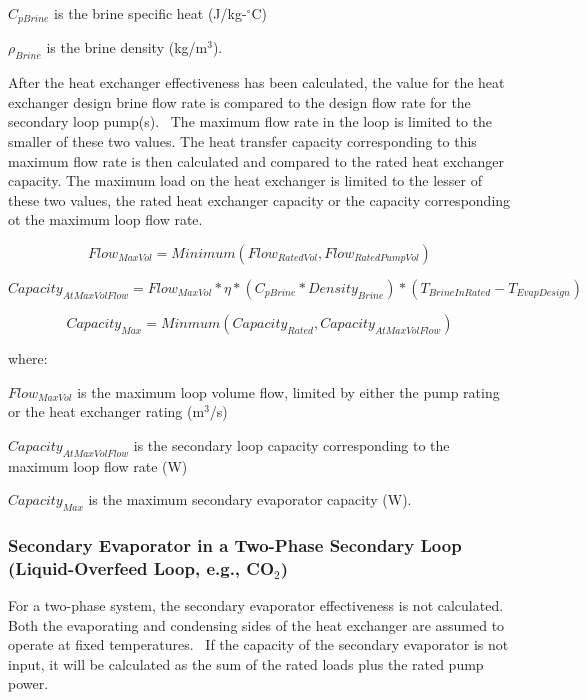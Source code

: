 \(C_{pBrine}\) is the brine specific heat (J/kg-\(^{\circ}\)C)

\(\rho_{Brine}\) is the brine density (kg/m\(^{3}\)).

After the heat exchanger effectiveness has been calculated, the value for the heat exchanger design brine flow rate is compared to the design flow rate for the secondary loop pump(s).~ The maximum flow rate in the loop is limited to the smaller of these two values. The heat transfer capacity corresponding to this maximum flow rate is then calculated and compared to the rated heat exchanger capacity. The maximum load on the heat exchanger is limited to the lesser of these two values, the rated heat exchanger capacity or the capacity corresponding ot the maximum loop flow rate.

\begin{equation}
Flow_{MaxVol} = Minimum(Flow_{RatedVol}, Flow_{RatedPumpVol})
\end{equation}

\begin{equation}
Capacity_{AtMaxVolFlow} = Flow_{MaxVol} * \eta *( C_{pBrine} * Density_{Brine})*( T_{BrineInRated} - T_{EvapDesign})
\end{equation}

\begin{equation}
Capacity_{Max} = Minmum(Capacity_{Rated}, Capacity_{AtMaxVolFlow})
\end{equation}

where:

\(Flow_{MaxVol}\) is the maximum loop volume flow, limited by either the pump rating or the heat exchanger rating (m\(^{3}\)/s)

\(Capacity_{AtMaxVolFlow}\) is the secondary loop capacity corresponding to the maximum loop flow rate (W)

\(Capacity_{Max}\) is the maximum secondary evaporator capacity (W).

\subsubsection{Secondary Evaporator in a Two-Phase Secondary Loop~ (Liquid-Overfeed Loop, e.g., CO\(_{2}\))}\label{secondary-evaporator-in-a-two-phase-secondary-loop-liquid-overfeed-loop-e.g.-coux5f2}

For a two-phase system, the secondary evaporator effectiveness is not calculated. Both the evaporating and condensing sides of the heat exchanger are assumed to operate at fixed temperatures.~ If the capacity of the secondary evaporator is not input, it will be calculated as the sum of the rated loads plus the rated pump power.

